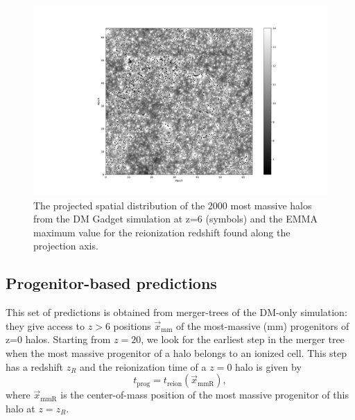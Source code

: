 \documentclass[twocolumn]{aastex61}
\newcommand{\dom}[1]{{#1}}
\begin{document}
\begin{figure}[ht]
\begin{center}
\includegraphics[width=2.3 \columnwidth]{img/maphalo.pdf}
\caption{The projected spatial distribution of the 2000 most massive halos from the DM Gadget simulation at z=6 (symbols) and \dom{the EMMA maximum value for the reionization redshift found along the projection axis}.}
\end{center}
\label{fig:reion_halo_map}
\end{figure}




\subsection{Progenitor-based predictions}
This set of predictions is obtained from merger-trees of the DM-only simulation: they give access to  $z>6$ positions $ \vec x_\mathrm{mm}$ of the most-massive (mm) progenitors of z=0 halos. Starting from $z=20$, we look for the earliest step in the merger tree when the most massive progenitor of a halo belongs to an ionized cell. This step has a redshift $z_R$ and the reionization time of a $z=0$ halo is given by
\begin{equation}
t_\mathrm{prog}=t_\mathrm{reion}(\vec x_\mathrm{mmR}),
\end{equation}
where $\vec x_\mathrm{mmR}$ is the center-of-mass position of the most massive progenitor of this halo at $z=z_R$.
\end{document}
